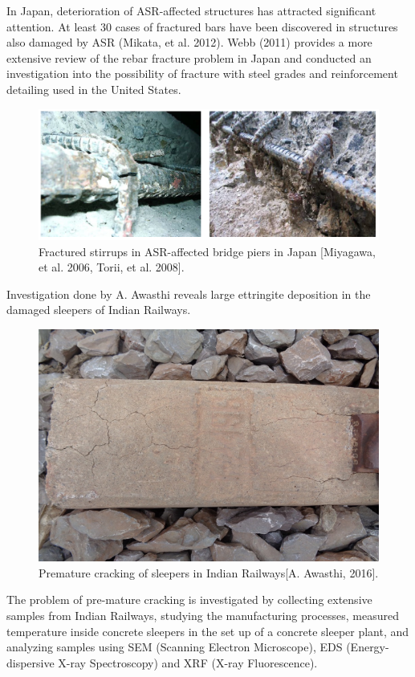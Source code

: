 
In Japan, deterioration of ASR-affected structures  has attracted significant attention. At least 30 cases of fractured bars have been discovered in structures also damaged by ASR (Mikata, et al. 2012)\cite{Mikata}. Webb (2011) \cite{Webb} provides a more extensive review of the rebar fracture problem in Japan and conducted an investigation into the possibility of fracture with steel grades and reinforcement detailing used in the United States.

    \begin{figure}[ht!]
        \centering
        \includegraphics[width=.9\linewidth]{Files/Background/Miyagawa.png}
        \caption{Fractured stirrups in ASR-affected bridge piers in Japan [Miyagawa, et al. 2006, Torii, et al. 2008].}
        \label{fig:Miyagawa}
    \end{figure}



Investigation done by A. Awasthi\cite{Awasthi} reveals large ettringite deposition in the damaged sleepers of Indian Railways.

    \begin{figure}[ht!]
        \centering
        \includegraphics[width=.4\linewidth]{Files/Background/Anupam_1.png}
        \caption{Premature cracking of sleepers in Indian Railways[A. Awasthi, 2016].}
        \label{fig:Awasthi_1}
    \end{figure}

The problem of pre-mature cracking is investigated by collecting extensive samples from Indian Railways, studying the manufacturing processes, measured temperature inside concrete sleepers in the set up of a concrete sleeper plant, and analyzing samples using SEM (Scanning Electron Microscope), EDS (Energy-dispersive X-ray Spectroscopy) and XRF (X-ray Fluorescence).


